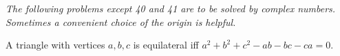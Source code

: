 \emph{The following problems except 40 and 41 are to be solved by complex numbers. Sometimes a convenient choice of the origin is helpful.}

A triangle with vertices $a, b, c$ is equilateral iff $a^2 + b^2 + c^2 - ab - bc - ca = 0$.
